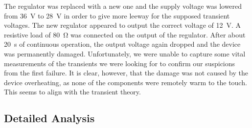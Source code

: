 The  regulator  was  replaced with a new one and the supply voltage was  lowered
from \SI{36}{\volt} to \SI{28}{\volt} in order  to  give  more  leeway  for  the
supposed transient voltages. The new  regulator  appeared  to output the correct
voltage of  \SI{12}{\volt}.  A  resistive load of \SI{80}{\ohm} was connected on
the output  of  the  regulator.  After  about  \SI{20}{\second}  of  continuous
operation,  the  output  voltage  again  dropped and the device was  permanently
damaged. Unfortunately, we were unable to capture some vital measurements of the
transients we were looking for to confirm our suspicions from the first failure.
It is clear, however, that the damage was not caused by the  device overheating,
as none  of  the components were remotely warm to the touch. This seems to align
with the transient theory.


\subsection{Detailed Analysis}


